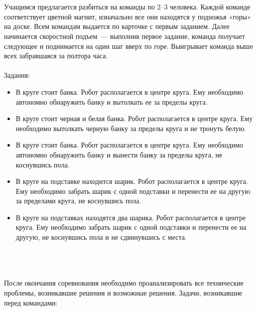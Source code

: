 {\hypertarget{lesson21x2}{}}\\\\

Учащимся предлагается разбиться на команды по 2--3 человека. Каждой команде соответствует цветной магнит, изначально все они находятся у подножья «горы» на доске. Всем командам выдается по карточке с первым заданием. Далее начинается скоростной подъем~--- выполнив первое задание, команда получает следующее и поднимается на один шаг вверх по горе. Выигрывает команда выше всех забравшаяся за полтора часа.\\\\

Задания:

\begin{itemize}
	\renewcommand{\labelitemi}{\stepcounter{competitionKingHill}\thecompetitionKingHill)}
	\item В круге стоит банка. Робот располагается в центре круга. Ему необходимо автономно обнаружить банку и вытолкать ее за пределы круга.
	\item В круге стоит черная и белая банка. Робот располагается в центре круга.  Ему необходимо вытолкать черную банку за пределы круга и не тронуть белую.
	\item В круге стоит банка. Робот располагается в центре круга. Ему необходимо автономно обнаружить банку и вынести банку за пределы круга, не коснувшись пола.
	\item В круге на подставке находится шарик. Робот располагается в центре круга. Ему необходимо забрать шарик с одной подставки и перенести ее на другую за пределами круга,  не коснувшись пола.
	\item В круге на подставках находятся два шарика. Робот располагается в центре круга. Ему необходимо забрать шарик с одной подставки и перенести ее на другую,  не коснувшись пола и не сдвинувшись с места.\\\\
\end{itemize}

{\hypertarget{lesson21x2}{}}\\\\

После окончания соревнования необходимо проанализировать все технические проблемы, возникавшие решения и возможные решения. Задачи, возникавшие перед командами:	

